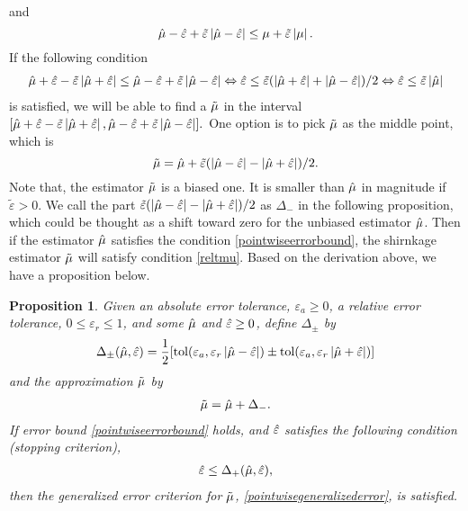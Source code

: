 \documentclass{iitthesis}
\newtheorem{proposition}[theorem]{Proposition}
\theoremstyle{definition}
\begin{document}
and 
$$\hat{\mu}-\hat{\varepsilon}+\tilde{\varepsilon}\left \lvert \hat{\mu}-\hat{\varepsilon} \right \rvert \leq \mu+\tilde{\varepsilon}\left \lvert \mu \right \rvert.$$
If the following condition 
\begin{align}\label{hmuhepscondition2}
\hat{\mu}+\hat{\varepsilon}-\tilde{\varepsilon}\left \lvert \hat{\mu}+\hat{\varepsilon} \right \rvert \leq \hat{\mu}-\hat{\varepsilon}+\tilde{\varepsilon}\left \lvert \hat{\mu}-\hat{\varepsilon} \right \rvert \Leftrightarrow \hat{\varepsilon} \leq \tilde{\varepsilon}(\left \lvert \hat{\mu}+\hat{\varepsilon} \right \rvert +\left \lvert \hat{\mu}-\hat{\varepsilon} \right \rvert)/2 \Leftrightarrow \hat{\varepsilon} \leq \tilde{\varepsilon} \left \lvert \hat{\mu} \right \rvert
\end{align}
is satisfied, 
we will be able to find a $\tilde{\mu}$ in the interval
$[\hat{\mu}+\hat{\varepsilon}-\tilde{\varepsilon}\left \lvert \hat{\mu}+\hat{\varepsilon} \right \rvert, \hat{\mu}-\hat{\varepsilon}+\tilde{\varepsilon}\left \lvert \hat{\mu}-\hat{\varepsilon} \right \rvert].$
One option is to pick $\tilde{\mu}$ as the middle point, which is
 $$\tilde{\mu} = \hat{\mu} +\tilde{\varepsilon} (\left \lvert \hat{\mu}-\hat{\varepsilon} \right \rvert-\left \lvert \hat{\mu}+\hat{\varepsilon} \right \rvert)/2.$$
Note that, the estimator $\tilde{\mu}$ is a biased one. It is smaller than $\hat{\mu}$ in magnitude if $\tilde{\varepsilon}>0$. We call the part $\tilde{\varepsilon} (\left \lvert \hat{\mu}-\hat{\varepsilon} \right \rvert-\left \lvert \hat{\mu}+\hat{\varepsilon} \right \rvert)/2$  as $\Delta_-$ in the following proposition, which could be thought as a shift toward zero for the unbiased estimator $\hat{\mu}$.  Then if the estimator $\hat{\mu}$ satisfies the condition \eqref{pointwiseerrorbound}, the shirnkage estimator $\tilde{\mu}$ will satisfy condition \eqref{reltmu}. Based on the derivation above, we have a proposition below.
\begin{proposition}\label{meanMCgProp}
Given an absolute error tolerance, $\varepsilon_a\geq 0$, a relative error tolerance, $0 \leq \varepsilon_r\le 1$, and some $\hat{\mu}$ and $\hat{\varepsilon}\geq 0$, define $\Delta_\pm$ by
\begin{align}\Delta_{\pm}(\hat{\mu},\hat{\varepsilon}) = \frac{1}{2} [\operatorname{tol}(\varepsilon_a, \varepsilon_r \left \lvert \hat{\mu}-\hat{\varepsilon} \right \rvert) \pm \operatorname{tol}(\varepsilon_a, \varepsilon_r \left \lvert \hat{\mu}+\hat{\varepsilon} \right \rvert)] \label{deltadef}
\end{align}
and the approximation $\tilde{\mu}$ by
\begin{align}
\tilde{\mu} = \hat{\mu} + \Delta_{-}. \label{appxsol}
\end{align}
If error bound \eqref{pointwiseerrorbound} holds, and $\hat{\varepsilon}$ satisfies the following condition (stopping criterion),
\begin{align}
\hat{\varepsilon}\leq \Delta_{+}(\hat{\mu},\hat{\varepsilon}),\label{deltacondition}
\end{align}
 then the generalized error criterion for $\tilde{\mu}$, \eqref{pointwisegeneralizederror}, is satisfied. 
 \end{proposition}
\end{document}
